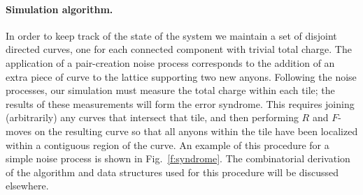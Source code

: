 \documentclass[aps, prl, letterpaper, twocolumn, superscriptaddress, notitlepage, 10pt]{revtex4-1}
\newcommand{\Fref}[1]{Fig.~\ref{#1}}
\newcommand{\cggb}[1]{\textcolor{blue}{#1}}
\newcommand{\dude}[1]{\textcolor{red}{#1}}
\begin{document}
\paragraph{Simulation algorithm.}



In order to keep track of the state of the system we maintain 
a set of disjoint directed curves, 
one for each connected component with trivial total charge.
The application of a pair-creation noise process corresponds to the 
addition of an extra piece of curve to the lattice supporting
two new anyons.
Following the noise processes, our simulation must %
measure the total charge within each tile; the results of 
these measurements will form the error syndrome. 
This requires joining (arbitrarily) any curves that intersect that tile, 
and then performing $R$ and $F$-moves on the resulting
curve so that 
all anyons within the tile have been 
localized within a contiguous region of the curve. 
An example of this 
procedure for a simple noise process is shown in \Fref{f:syndrome}.
The combinatorial derivation of the algorithm and data structures used for 
this procedure will be discussed elsewhere.
\end{document}
